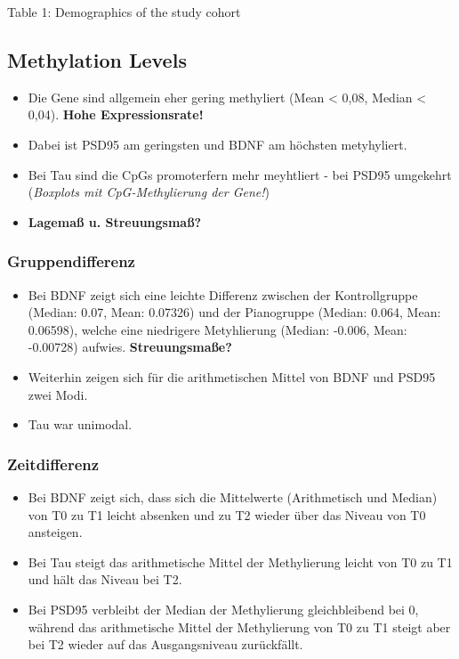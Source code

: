 \documentclass[
]{agujournal2019}
\providecommand{\tightlist}{%
  \setlength{\itemsep}{0pt}\setlength{\parskip}{0pt}}\usepackage{longtable,booktabs,array}
\begin{document}
Table 1: Demographics of the study cohort

\subsection{Methylation Levels}\label{methylation-levels}

\begin{itemize}
\tightlist
\item
  Die Gene sind allgemein eher gering methyliert (Mean \textless{} 0,08,
  Median \textless{} 0,04). \textbf{Hohe Expressionsrate!}
\item
  Dabei ist PSD95 am geringsten und BDNF am höchsten metyhyliert.
\item
  Bei Tau sind die CpGs promoterfern mehr meyhtliert - bei PSD95
  umgekehrt (\emph{Boxplots mit CpG-Methylierung der Gene!})
\item
  \textbf{Lagemaß u. Streuungsmaß?}
\end{itemize}

\subsubsection{Gruppendifferenz}\label{gruppendifferenz}

\begin{itemize}
\tightlist
\item
  Bei BDNF zeigt sich eine leichte Differenz zwischen der Kontrollgruppe
  (Median: 0.07, Mean: 0.07326) und der Pianogruppe (Median: 0.064,
  Mean: 0.06598), welche eine niedrigere Metyhlierung (Median: -0.006,
  Mean: -0.00728) aufwies. \textbf{Streuungsmaße?}
\item
  Weiterhin zeigen sich für die arithmetischen Mittel von BDNF und PSD95
  zwei Modi.
\item
  Tau war unimodal.
\end{itemize}

\subsubsection{Zeitdifferenz}\label{zeitdifferenz}

\begin{itemize}
\tightlist
\item
  Bei BDNF zeigt sich, dass sich die Mittelwerte (Arithmetisch und
  Median) von T0 zu T1 leicht absenken und zu T2 wieder über das Niveau
  von T0 ansteigen.
\item
  Bei Tau steigt das arithmetische Mittel der Methylierung leicht von T0
  zu T1 und hält das Niveau bei T2.
\item
  Bei PSD95 verbleibt der Median der Methylierung gleichbleibend bei 0,
  während das arithmetische Mittel der Methylierung von T0 zu T1 steigt
  aber bei T2 wieder auf das Ausgangsniveau zurückfällt.
\end{itemize}
\end{document}
